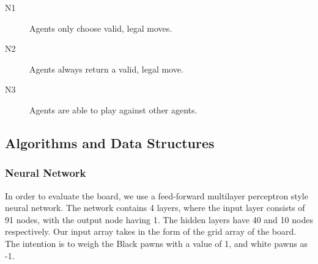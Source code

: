 \documentclass[12pt,a4paper]{article}
\begin{document}
    \begin{description}  
        \item [N1] Agents only choose valid, legal moves.
        \item [N2] Agents always return a valid, legal move.
        \item [N3] Agents are able to play against other agents.
    \end{description}


\subsection*{Algorithms and Data Structures}
\subsubsection{Neural Network}

    In order to evaluate the board, we use a feed-forward multilayer perceptron style neural network. The network contains 4 layers, where the input layer consists of 91 nodes, with the output node having 1. The hidden layers have 40 and 10 nodes respectively. Our input array takes in the form of the grid array of the board. The intention is to weigh the Black pawns with a value of 1, and white pawns as -1. 
\end{document}
